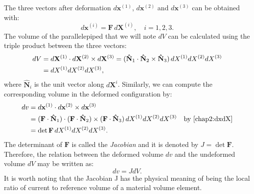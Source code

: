 The three vectors after deformation $d\mathbf{x}^{(1)}$, $d\mathbf{x}^{(2)}$ and $d\mathbf{x}^{(3)}$ can be obtained with:
\begin{equation}
\label{chap2:dxdX}
d\mathbf{x}^{(i)} = \mathbf{F} \, d\mathbf{X}^{(i)}, \quad i = 1, 2, 3.
\end{equation}
The volume of the parallelepiped that we will note $dV$  can be calculated using the triple product between the three vectors:
\begin{align}
dV &= d\mathbf{X}^{(1)} \cdot d\mathbf{X}^{(2)} \times d\mathbf{X}^{(3)} = (\mathbf{\hat{N}}_{1} \cdot \mathbf{\hat{N}}_{2} \times \mathbf{\hat{N}}_{3}) \, dX^{(1)} dX^{(2)} dX^{(3)} \notag \\
&= dX^{(1)} dX^{(2)} dX^{(3)}, \label{chap2:dV}
\end{align}
where $\mathbf{\hat{N}}_{i}$ \ON is \OFF the unit vector along $d\mathbf{X}^{i}$. \ON Similarly, we can compute the \OFF corresponding volume in the deformed configuration by:
\begin{align}
dv &= d\mathbf{x}^{(1)} \cdot d\mathbf{x}^{(2)} \times d\mathbf{x}^{(3)} \notag \\
&=  (\mathbf{F} \cdot \mathbf{\hat{N}}_{1}) \cdot (\mathbf{F} \cdot \mathbf{\hat{N}}_{2}) \times (\mathbf{F} \cdot \mathbf{\hat{N}}_{3}) \,  dX^{(1)} dX^{(2)} dX^{(3)} \quad \text{by \eqref{chap2:dxdX}} \notag \\
&= \det \mathbf{F} \, dX^{(1)} dX^{(2)} dX^{(3)}. \label{chap2:dv}
\end{align}
The determinant of $\mathbf{F}$ is called the \emph{Jacobian} and it is denoted by $J = \det \mathbf{F}$. \ON Therefore, the relation between the deformed volume $ dv $ and the undeformed volume $ dV $ may be written as: \OFF
\begin{equation}
\label{chap2:dvdV}
dv = J dV.
\end{equation}
\ON It is worth noting that the Jacobian \OFF  J has the physical meaning of being the local ratio of current to reference volume of a material volume element.


